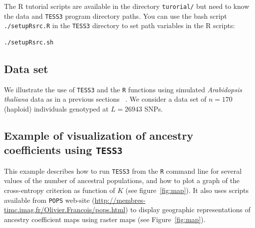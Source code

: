 \documentclass[10pt,a4paper]{article}
\begin{document}
The R tutorial scripts are available in the directory \verb|turorial/| but need to know the data and {\tt TESS3} program directory paths. You can use the bash script \verb|./setupRsrc.R| in the {\tt TESS3} directory to set path variables in the R scripts:
\begin{Verbatim}[frame=single]
./setupRsrc.sh 
\end{Verbatim}

\subsection{Data set}

We illustrate the use of {\tt TESS3} and the {\tt R} functions using simulated {\it Arabidopsis thaliana} data as in a previous sections ~\cite{atwell2010genome}. We consider a data set of $n = 170$ (haploid) individuals genotyped at $L = 26943$ SNPs.

\subsection{Example of visualization of ancestry coefficients using {\tt TESS3}}

This example describes how to run {\tt TESS3} from the {\tt R} command line for several values of the number of ancestral populations, and how to plot a graph of the cross-entropy criterion as function of $K$ (see figure~\ref{fig:map}). It also uses scripts available from {\tt POPS} web-site (\url{http://membres-timc.imag.fr/Olivier.Francois/pops.html}) to display geographic representations of ancestry coefficient maps using raster maps \cite{jay2012forecasting} (see Figure~\ref{fig:map}). 
\end{document}
